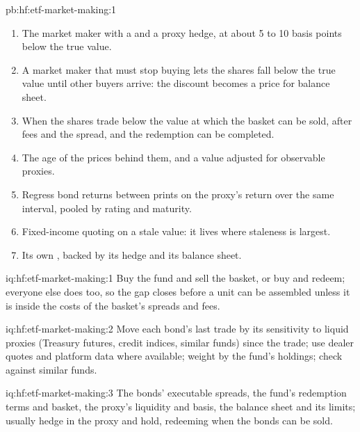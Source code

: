\begin{solution}{pb:hf:etf-market-making:1}
\begin{enumerate}
was staleness and $-5$ its own discount to the true value.
\item The market maker with a  and a proxy hedge, at about 5 to 10 basis points below the true value.
\item A market maker that must stop buying lets the shares fall below the true value until other buyers arrive: the discount becomes a price for
balance sheet.
\item When the shares trade below the value at which the basket can be sold, after fees and the spread, and the redemption can be completed.
\item The age of the prices behind them, and a value adjusted for observable proxies.
\item Regress bond returns between prints on the proxy's return over the same interval, pooled by rating and maturity.
\item Fixed-income quoting on a stale value: it lives where staleness is largest.
\item Its own , backed by its hedge and its balance sheet.
\end{enumerate}
\end{solution}

\begin{solution}{iq:hf:etf-market-making:1}
Buy the fund and sell the basket, or buy and redeem; everyone else does too, so the gap closes before a unit can be assembled unless it is inside the
costs of the basket's spreads and fees.
\end{solution}

\begin{solution}{iq:hf:etf-market-making:2}
Move each bond's last trade by its sensitivity to liquid proxies (Treasury futures, credit indices, similar funds) since the trade; use dealer quotes
and platform data where available; weight by the fund's holdings; check against similar funds.
\end{solution}

\begin{solution}{iq:hf:etf-market-making:3}
The bonds' executable spreads, the fund's redemption terms and basket, the proxy's liquidity and basis, the balance sheet and its limits; usually
hedge in the proxy and hold, redeeming when the bonds can be sold.
\end{solution}

